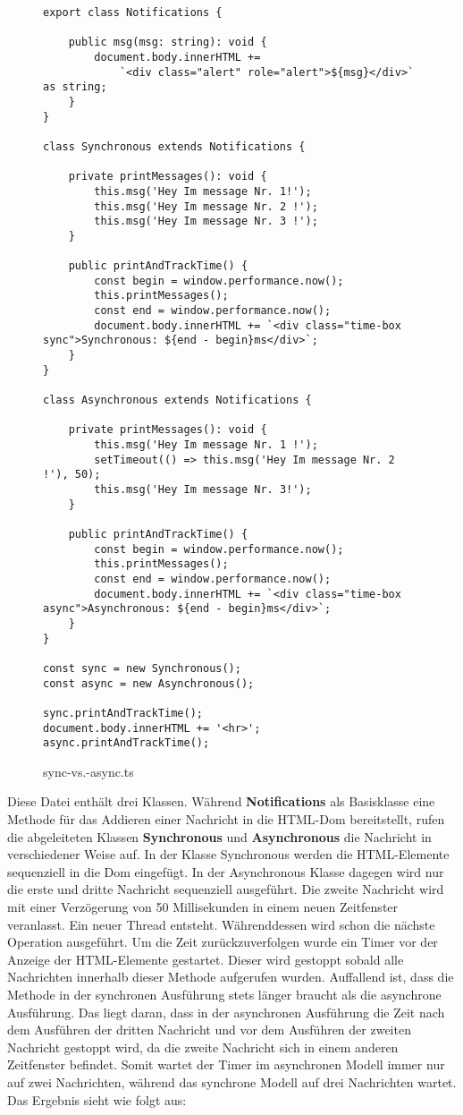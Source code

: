 \begin{figure}[H]
\begin{lstlisting}
export class Notifications {

    public msg(msg: string): void {
        document.body.innerHTML +=
            `<div class="alert" role="alert">${msg}</div>` as string;
    }
}

class Synchronous extends Notifications {

    private printMessages(): void {
        this.msg('Hey Im message Nr. 1!');
        this.msg('Hey Im message Nr. 2 !');
        this.msg('Hey Im message Nr. 3 !');
    }

    public printAndTrackTime() {
        const begin = window.performance.now();
        this.printMessages();
        const end = window.performance.now();
        document.body.innerHTML += `<div class="time-box sync">Synchronous: ${end - begin}ms</div>`;
    }
}

class Asynchronous extends Notifications {

    private printMessages(): void {
        this.msg('Hey Im message Nr. 1 !');
        setTimeout(() => this.msg('Hey Im message Nr. 2 !'), 50);
        this.msg('Hey Im message Nr. 3!');
    }

    public printAndTrackTime() {
        const begin = window.performance.now();
        this.printMessages();
        const end = window.performance.now();
        document.body.innerHTML += `<div class="time-box async">Asynchronous: ${end - begin}ms</div>`;
    }
}

const sync = new Synchronous();
const async = new Asynchronous();

sync.printAndTrackTime();
document.body.innerHTML += '<hr>';
async.printAndTrackTime();
\end{lstlisting}
\caption{sync-vs.-async.ts}
\end{figure}

\noindent
Diese Datei enthält drei Klassen. Während \textbf{Notifications} als Basisklasse eine Methode für das Addieren einer Nachricht in die HTML-Dom bereitstellt, rufen die abgeleiteten Klassen \textbf{Synchronous} und \textbf{Asynchronous} die Nachricht in verschiedener Weise auf. In der Klasse Synchronous werden die HTML-Elemente sequenziell in die Dom eingefügt. In der Asynchronous Klasse dagegen wird nur die erste und dritte Nachricht sequenziell ausgeführt. Die zweite Nachricht wird mit einer Verzögerung von 50 Millisekunden in einem neuen Zeitfenster veranlasst. Ein neuer Thread entsteht. Währenddessen wird schon die nächste Operation ausgeführt. Um die Zeit zurückzuverfolgen wurde ein Timer vor der Anzeige der HTML-Elemente gestartet. Dieser wird gestoppt sobald alle Nachrichten innerhalb dieser Methode aufgerufen wurden. Auffallend ist, dass die Methode in der synchronen Ausführung stets länger braucht als die asynchrone Ausführung. Das liegt daran, dass in der asynchronen Ausführung die Zeit nach dem Ausführen der dritten Nachricht und vor dem Ausführen der zweiten Nachricht gestoppt wird, da die zweite Nachricht sich in einem anderen Zeitfenster befindet. Somit wartet der Timer im asynchronen Modell immer nur auf zwei Nachrichten, während das synchrone Modell auf drei Nachrichten wartet.
Das Ergebnis sieht wie folgt aus:

